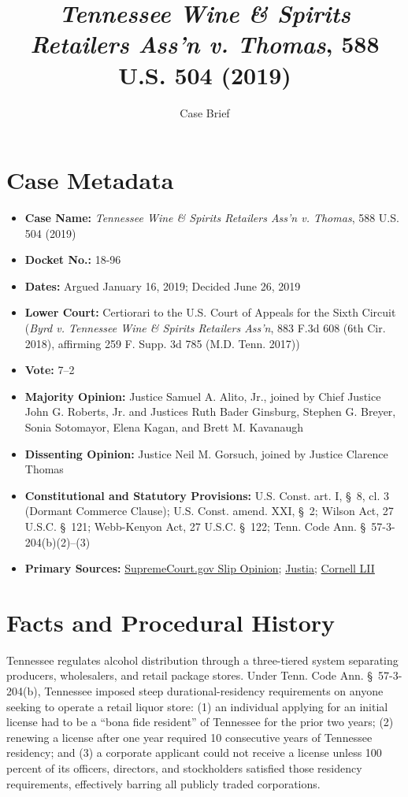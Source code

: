 \documentclass[12pt]{article}
\title{\textit{Tennessee Wine \& Spirits Retailers Ass'n v. Thomas}, 588 U.S. 504 (2019)}
\author{Case Brief}
\date{}
\begin{document}
\maketitle

\section{Case Metadata}

\begin{itemize}
    \item \textbf{Case Name:} \textit{Tennessee Wine \& Spirits Retailers Ass'n v. Thomas}, 588 U.S. 504 (2019)
    \item \textbf{Docket No.:} 18-96
    \item \textbf{Dates:} Argued January 16, 2019; Decided June 26, 2019
    \item \textbf{Lower Court:} Certiorari to the U.S. Court of Appeals for the Sixth Circuit (\textit{Byrd v. Tennessee Wine \& Spirits Retailers Ass'n}, 883 F.3d 608 (6th Cir. 2018), affirming 259 F. Supp. 3d 785 (M.D. Tenn. 2017))
    \item \textbf{Vote:} 7--2
    \item \textbf{Majority Opinion:} Justice Samuel A. Alito, Jr., joined by Chief Justice John G. Roberts, Jr. and Justices Ruth Bader Ginsburg, Stephen G. Breyer, Sonia Sotomayor, Elena Kagan, and Brett M. Kavanaugh
    \item \textbf{Dissenting Opinion:} Justice Neil M. Gorsuch, joined by Justice Clarence Thomas
    \item \textbf{Constitutional and Statutory Provisions:} U.S. Const. art. I, \S~8, cl. 3 (Dormant Commerce Clause); U.S. Const. amend. XXI, \S~2; Wilson Act, 27 U.S.C. \S~121; Webb-Kenyon Act, 27 U.S.C. \S~122; Tenn. Code Ann. \S~57-3-204(b)(2)--(3)
    \item \textbf{Primary Sources:} \href{https://www.supremecourt.gov/opinions/18pdf/18-96_5i36.pdf}{SupremeCourt.gov Slip Opinion}; \href{https://supreme.justia.com/cases/federal/us/588/18-96/}{Justia}; \href{https://www.law.cornell.edu/supremecourt/text/18-96}{Cornell LII}
\end{itemize}

\section{Facts and Procedural History}

Tennessee regulates alcohol distribution through a three-tiered system separating producers, wholesalers, and retail package stores. Under Tenn. Code Ann. \S~57-3-204(b), Tennessee imposed steep durational-residency requirements on anyone seeking to operate a retail liquor store: (1) an individual applying for an initial license had to be a ``bona fide resident'' of Tennessee for the prior two years; (2) renewing a license after one year required 10 consecutive years of Tennessee residency; and (3) a corporate applicant could not receive a license unless 100 percent of its officers, directors, and stockholders satisfied those residency requirements, effectively barring all publicly traded corporations.
\end{document}
